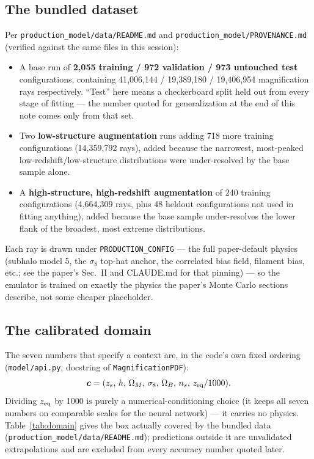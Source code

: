 \documentclass[11pt]{article}
\newcommand{\code}[1]{\texttt{#1}}
\newcommand{\file}[1]{\texttt{#1}}
\newcommand{\vect}[1]{\boldsymbol{#1}}
\begin{document}
\subsection{The bundled dataset}

Per \file{production\_model/data/README.md} and
\file{production\_model/PROVENANCE.md} (verified against the same files in
this session):

\begin{itemize}
 \item A base run of \textbf{2{,}055 training / 972 validation / 973
   untouched test} configurations, containing 41{,}006{,}144 /
   19{,}389{,}180 / 19{,}406{,}954 magnification rays respectively. ``Test''
   here means a checkerboard split held out from every stage of fitting —
   the number quoted for generalization at the end of this note comes only
   from that set.
 \item Two \textbf{low-structure augmentation} runs adding 718 more training
   configurations (14{,}359{,}792 rays), added because the narrowest,
   most-peaked low-redshift/low-structure distributions were under-resolved
   by the base sample alone.
 \item A \textbf{high-structure, high-redshift augmentation} of 240 training
   configurations (4{,}664{,}309 rays, plus 48 heldout configurations not
   used in fitting anything), added because the base sample under-resolves
   the lower flank of the broadest, most extreme distributions.
\end{itemize}

Each ray is drawn under \code{PRODUCTION\_CONFIG} — the full paper-default
physics (subhalo model 5, the $\sigma_8$ top-hat anchor, the correlated bias
field, filament bias, etc.; see the paper's Sec.~II and CLAUDE.md for that
pinning) — so the emulator is trained on exactly the physics the paper's
Monte Carlo sections describe, not some cheaper placeholder.

\subsection{The calibrated domain}

The seven numbers that specify a context are, in the code's own fixed
ordering (\file{model/api.py}, docstring of \code{MagnificationPDF}):
\[
 \vect c = (z_s,\, h,\, \Omega_M,\, \sigma_8,\, \Omega_B,\, n_s,\, z_{\rm
 eq}/1000).
\]
Dividing $z_{\rm eq}$ by 1000 is purely a numerical-conditioning choice (it
keeps all seven numbers on comparable scales for the neural network) — it
carries no physics. Table~\ref{tab:domain} gives the box actually covered by
the bundled data (\file{production\_model/data/README.md}); predictions
outside it are unvalidated extrapolations and are excluded from every
accuracy number quoted later.
\end{document}
